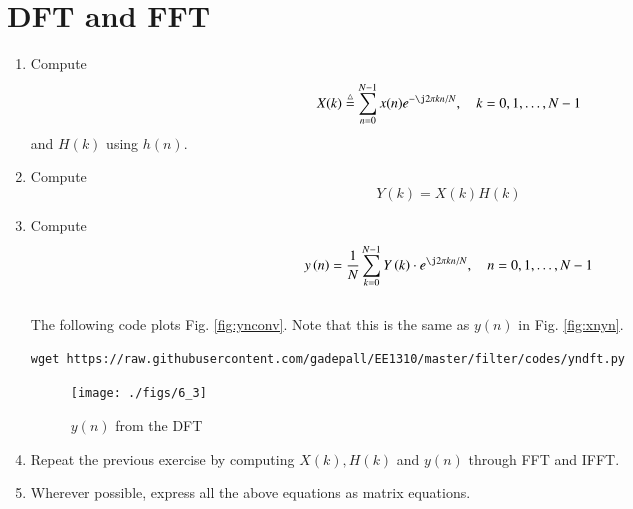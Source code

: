 \section{DFT and FFT}
\begin{enumerate}[label=\thesection.\arabic*]
\item
Compute
\begin{equation}
X(k) \define \sum _{n=0}^{N-1}x(n) e^{-\j2\pi kn/N}, \quad k = 0,1,\dots, N-1
\end{equation}
and $H(k)$ using $h(n)$.
\item Compute 
\begin{equation}
Y(k) = X(k)H(k)
\end{equation}
\item Compute
\begin{equation}
 y\brak{n}={\frac {1}{N}}\sum _{k=0}^{N-1}Y\brak{k}\cdot e^{\j 2\pi kn/N},\quad n = 0,1,\dots, N-1
\end{equation}
\\
\solution The following code plots Fig. \ref{fig:ynconv}. Note that this is the same as 
$y(n)$ in  Fig. 
\ref{fig:xnyn}. 
%
\begin{lstlisting}
wget https://raw.githubusercontent.com/gadepall/EE1310/master/filter/codes/yndft.py
\end{lstlisting}
\begin{figure}[!ht]
\centering
\texttt{[image: ./figs/6\_3]}
\caption{$y(n)$ from the DFT}
\label{fig:yndft}
\end{figure}
\item Repeat the previous exercise by computing $X(k), H(k)$ and $y(n)$ through FFT and 
IFFT.
\item Wherever possible, express all the above equations as matrix equations.
\end{enumerate}
%
